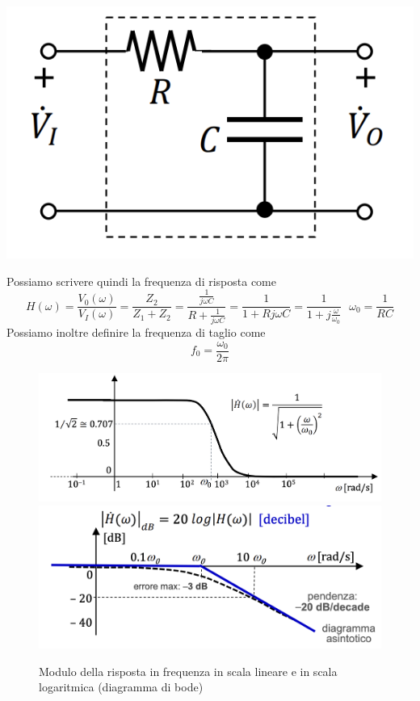 \documentclass{article}
\theoremstyle{definition}
\begin{document}
\begin{itemize}
\begin{itemize}
\begin{center}
	\includegraphics[scale=0.50]{immagini/pb}
\end{center}
Possiamo scrivere quindi la frequenza di risposta come 
$$H(\omega)=\frac{V_0(\omega)}{V_I(\omega)}=\frac{Z_2}{Z_1+Z_2}=\frac{\frac{1}{j\omega C}}{R+\frac{1}{j\omega C}}=\frac{1}{1+Rj\omega C}{=\frac{1}{1+j\frac{\omega}{\omega_0}}} \ \ \ \omega_0=\frac{1}{RC}$$
Possiamo inoltre definire la frequenza di taglio come 
$$f_0=\frac{\omega_0}{2\pi}$$
\begin{figure}[h]
	\centering 
	\includegraphics[scale=0.25]{immagini/pbg}
	\hfil 
	\includegraphics[scale=0.35]{immagini/pbbode}
	\caption{Modulo della risposta in frequenza in scala lineare e in scala logaritmica (diagramma di bode)}

\end{figure}
\end{itemize}
\end{itemize}
\end{document}
